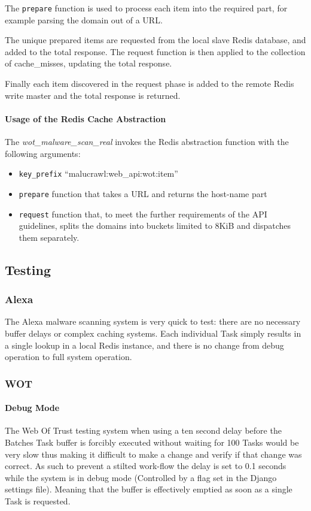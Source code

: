 The \verb`prepare` function is used to process each item into the required part, for example parsing the domain out of a URL.

The unique prepared items are requested from the local slave Redis database, and added to the total response. The request function is then applied to the collection of cache\_misses, updating the total response.

Finally each item discovered in the request phase is added to the remote Redis write master and the total response is returned.

\paragraph{Usage of the Redis Cache Abstraction}
The \emph{wot\_malware\_scan\_real} invokes the Redis abstraction function with the following arguments:
\begin{itemize}
    \item \verb`key_prefix` ``malucrawl:web\_api:wot:{item}''
    \item \verb`prepare` function that takes a URL and returns the host-name part
    \item \verb`request` function that, to meet the further requirements of the API guidelines, splits the domains into buckets limited to 8KiB and dispatches them separately.
\end{itemize}

\subsection{Testing}
\subsubsection{Alexa}
The Alexa malware scanning system is very quick to test: there are no necessary buffer delays or complex caching systems. Each individual Task simply results in a single lookup in a local Redis instance, and there is no change from debug operation to full system operation.

\subsubsection{WOT}
\paragraph{Debug Mode}
The Web Of Trust testing system when using a ten second delay before the Batches Task buffer is forcibly executed without waiting for 100 Tasks would be very slow thus making it difficult to make a change and verify if that change was correct. As such to prevent a stilted work-flow the delay is set to 0.1 seconds while the system is in debug mode (Controlled by a flag set in the Django settings file).  Meaning that the buffer is effectively emptied as soon as a single Task is requested.
